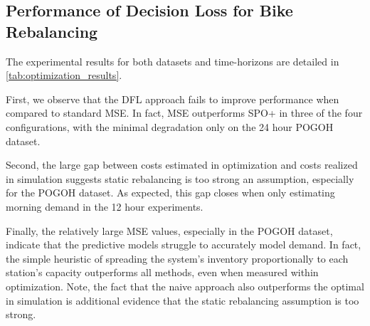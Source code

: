 \documentclass{article}
\begin{document}
\subsection{Performance of Decision Loss for Bike Rebalancing}
The experimental results for both datasets and time-horizons are detailed in \cref{tab:optimization_results}.

First, we observe that the DFL approach fails to improve performance when compared to standard MSE. In fact, MSE outperforms SPO+ in three of the four configurations, with the minimal degradation only on the 24 hour POGOH dataset. 

Second, the large gap between costs estimated in optimization and costs realized in simulation suggests static rebalancing is too strong an assumption, especially for the POGOH dataset. As expected, this gap closes when only estimating morning demand in the 12 hour experiments. 

Finally, the relatively large MSE values, especially in the POGOH dataset, indicate that the predictive models struggle to accurately model demand. In fact, the simple heuristic of spreading the system's inventory proportionally to each station's capacity outperforms all methods, even 
when measured within optimization. Note, the fact that the naive approach also outperforms the optimal in simulation is additional evidence that the static rebalancing assumption is too strong.
\end{document}
